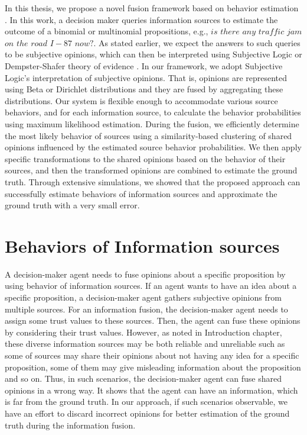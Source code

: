 \documentclass[a4,12pt]{ozu-thesis}
\begin{document}
 In this thesis, we propose a novel fusion framework based on behavior estimation \cite{sensoy2015fuse}. In this work, a decision maker queries information sources to estimate the outcome of a binomial or multinomial propositions, e.g., $\mathit{is}$ $\mathit{there}$ $\mathit{any}$ $\mathit{traffic}$ $\mathit{jam}$ $\mathit{on}$ $\mathit{the}$ $\mathit{road}$ $\mathit{I-87}$ $\mathit{now?}$. As stated earlier, we expect the answers to such queries to be subjective opinions, which can then be interpreted using Subjective Logic \cite{josang2001logic} or Dempster-Shafer theory of evidence \cite{yager2008classic}. In our framework, we adopt Subjective Logic’s interpretation of subjective opinions. That is, opinions are represented using Beta or Dirichlet distributions and they are fused by aggregating these distributions. Our system is flexible enough to accommodate various source behaviors, and for each information source, to calculate the behavior probabilities using maximum likelihood estimation. During the fusion, we efficiently determine the most likely behavior of sources using a similarity-based clustering of shared opinions influenced by the estimated source behavior probabilities. We then apply specific transformations to the shared opinions based on the behavior of their sources, and then the transformed opinions are combined to estimate the ground truth. Through extensive simulations, we showed that the proposed approach can successfully estimate behaviors of information sources and approximate the ground truth with a very small error. 


\section{Behaviors of Information sources}
A decision-maker agent needs to fuse opinions about a specific proposition by using behavior of information sources. If an agent wants to have an idea about a specific proposition, a decision-maker agent gathers subjective opinions from multiple sources. For an information fusion, the decision-maker agent needs to assign some trust values to these sources. Then, the agent can fuse these opinions by considering their trust values. However, as noted in Introduction chapter, these diverse information sources may be both reliable and unreliable such as some of sources may share their opinions about not having any idea for a specific proposition, some of them may give misleading information about the proposition and so on. Thus, in such scenarios, the decision-maker agent can fuse shared opinions in a wrong way. It shows that the agent can have an information, which is far from the ground truth. In our approach, if such scenarios observable, we have an effort to discard incorrect opinions for better estimation of the ground truth during the information fusion.
\end{document}
